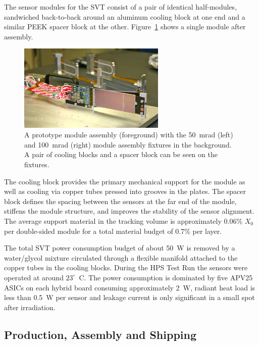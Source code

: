 \documentclass[final,3p,times,twocolumn]{elsarticle}
\begin{document}
The sensor modules for the SVT consist of a pair of identical half-modules, sandwiched back-to-back 
around an aluminum cooling block at one end and a similar PEEK spacer block at the other. 
Figure~\ref{fig:tracker_module} shows a single module after assembly.
\begin{figure}[htp]
	\begin{center}
   	 \includegraphics[width=7cm]{IMG_5200}
	\caption{\small A prototype module assembly (foreground) with the 50~mrad (left) and 100~mrad (right) module assembly fixtures in the background.  A pair of cooling blocks and a spacer block can be seen on the fixtures.
\label{fig:tracker_module}}
\end{center}
\end{figure}
The cooling block provides the primary mechanical support for the module as well as cooling via copper 
tubes pressed into grooves in the plates. The spacer block defines the spacing between the sensors at 
the far end of the module, stiffens the module structure, and improves the stability of the sensor 
alignment.  The average support material in the tracking volume is approximately 0.06\% $X_{0}$ per 
double-sided module for a total material budget of 0.7\% per layer.

The total SVT power consumption budget of about 50~W is removed by a water/glycol mixture 
circulated through a flexible manifold attached to the copper tubes in the cooling blocks. During the 
HPS Test Run the sensors were operated at around $23^{\circ}$~C. The power consumption is 
dominated by five 
APV25 ASICs on each hybrid board consuming approximately 2~W, radiant heat load is less than 
0.5~W per sensor and leakage current is only significant in a small spot after irradiation.  







\subsection{Production, Assembly and Shipping}
\end{document}
